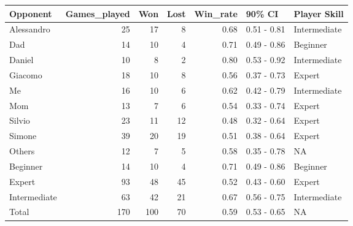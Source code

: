 \begin{tabular}{lrrrrll}
\toprule
    Opponent &  Games\_played &  Won &  Lost &  Win\_rate &      90\% CI & Player Skill \\
\midrule
  Alessandro &            25 &   17 &     8 &      0.68 & 0.51 - 0.81 & Intermediate \\
         Dad &            14 &   10 &     4 &      0.71 & 0.49 - 0.86 &     Beginner \\
      Daniel &            10 &    8 &     2 &      0.80 & 0.53 - 0.92 & Intermediate \\
     Giacomo &            18 &   10 &     8 &      0.56 & 0.37 - 0.73 &       Expert \\
          Me &            16 &   10 &     6 &      0.62 & 0.42 - 0.79 & Intermediate \\
         Mom &            13 &    7 &     6 &      0.54 & 0.33 - 0.74 &       Expert \\
      Silvio &            23 &   11 &    12 &      0.48 & 0.32 - 0.64 &       Expert \\
      Simone &            39 &   20 &    19 &      0.51 & 0.38 - 0.64 &       Expert \\
      Others &            12 &    7 &     5 &      0.58 & 0.35 - 0.78 &           NA \\
    Beginner &            14 &   10 &     4 &      0.71 & 0.49 - 0.86 &     Beginner \\
      Expert &            93 &   48 &    45 &      0.52 & 0.43 - 0.60 &       Expert \\
Intermediate &            63 &   42 &    21 &      0.67 & 0.56 - 0.75 & Intermediate \\
       Total &           170 &  100 &    70 &      0.59 & 0.53 - 0.65 &           NA \\
\bottomrule
\end{tabular}

